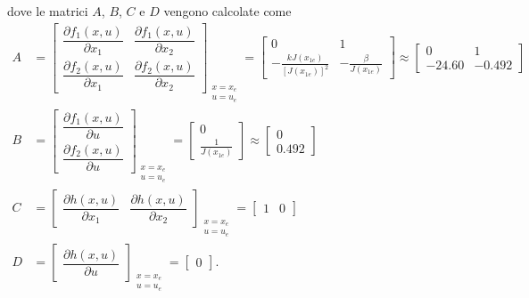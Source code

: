 \documentclass[a4paper, 11pt]{article}
\begin{document}
dove le matrici $A$, $B$, $C$ e $D$ vengono calcolate come
%
\begin{subequations}\label{eq:matrices}
\begin{align}
	A &= \begin{bmatrix}
\dfrac{\partial f_1(x,u)}{\partial x_1} & \dfrac{\partial f_1(x,u)}{\partial x_2} \\
\dfrac{\partial f_2(x,u)}{\partial x_1} & \dfrac{\partial f_2(x,u)}{\partial x_2}
\end{bmatrix}_{\substack{x = x_e \\ u = u_e}}
=
\begin{bmatrix}
0 & 1 \\
-\frac{kJ(x_{1e})}{[J(x_{1e})]^2} & -\frac{\beta}{J(x_{1e})}
\end{bmatrix} \approx \begin{bmatrix}
    0 & 1 
    \\
    -24.60 & -0.492
\end{bmatrix}
	\\
	B &= \begin{bmatrix}
\dfrac{\partial f_1(x,u)}{\partial u} \\
\dfrac{\partial f_2(x,u)}{\partial u}
\end{bmatrix}_{\substack{x = x_e \\ u = u_e}}
=
\begin{bmatrix}
0 \\
\frac{1}{J(x_{1e})}
\end{bmatrix} \approx
\begin{bmatrix}
    0
    \\
    0.492
\end{bmatrix}
	\\
	C &= \begin{bmatrix}
\dfrac{\partial h(x,u)}{\partial x_1} &
\dfrac{\partial h(x,u)}{\partial x_2}
\end{bmatrix}_{\substack{x = x_e \\ u = u_e}}
=
\begin{bmatrix}
1 & 0
\end{bmatrix}
	\\
	D &= \begin{bmatrix}
	    \dfrac{\partial h(x,u)}{\partial u} \end{bmatrix}_{\substack{x = x_e \\ u = u_e}}
= \begin{bmatrix}
    0
\end{bmatrix}.
\end{align}
\end{subequations}
%
\end{document}
